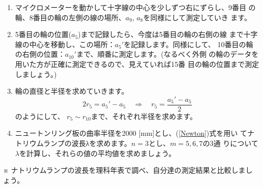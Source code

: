 \begin{enumerate}
\begin{enumerate}
\item マイクロメーターを動かして十字線の中心を少しずつ右にずらし、9番目 
の輪、8番目の輪の左側の線の場所、$a_9$, $a_8$を同様にして測定していき 
ます。

\item 5番目の輪の位置($a_5$)まで記録したら、今度は5番目の輪の右側の線
まで十字線の中心を移動し、この場所：$a_5'$を記録します。同様にして、
10番目の輪の右側の位置：$a_{10}'$まで、順番に測定します。(なるべく外側
の輪のデータを用いた方が正確に測定できるので、見えていれば15番
目の輪の位置まで測定しましょう。)

\item 輪の直径と半径を求めていきます。
\[
2r_5= a_5'-a_5 \quad \Rightarrow \quad r_5=\frac{a_5'-a_5}{2}
\]
のようにして、 $r_5\sim r_{10}$まで、それぞれ半径を求めます。

\item ニュートンリング板の曲率半径を2000 [mm]とし、(\ref{Newton})式を用い
てナトリウムランプの波長λを求めます。$n=3$とし、$m=5, 6, 7$の3通
りについて$\lambda$を計算し、それらの値の平均値を求めましょう。


\end{enumerate}


\end{enumerate}



\hspace*{-\parindent}
※ ナトリウムランプの波長を理科年表で調べ、自分達の測定結果と比較しましょう。

